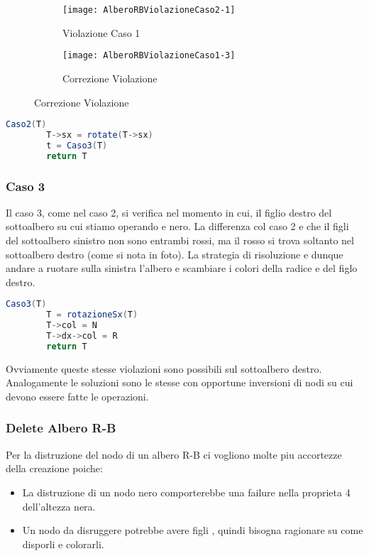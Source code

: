 \begin{figure}[H]
    \centering
    \begin{subfigure}[b]{0.35\textwidth}
        \texttt{[image: AlberoRBViolazioneCaso2-1]} 
        \caption{Violazione Caso 1}
    \end{subfigure}
    \hfill
    \begin{subfigure}[b]{0.35\textwidth}
        \texttt{[image: AlberoRBViolazioneCaso1-3]} 
        \caption{Correzione Violazione}
    \end{subfigure}
\end{figure}

\begin{lstlisting}[language=Java]
	Caso2(T)
		T->sx = rotate(T->sx)
		t = Caso3(T)
		return T
\end{lstlisting}

\subsubsection{Caso 3}

Il caso 3, come nel caso 2, si verifica nel momento in cui, il figlio destro del sottoalbero su cui stiamo operando e nero. La differenza col caso 2 e che il figli del sottoalbero sinistro non sono entrambi rossi, ma il rosso si trova soltanto nel sottoalbero destro (come si nota in foto).
La strategia di risoluzione e dunque andare a ruotare sulla sinistra l'albero e scambiare i colori della radice e del figlo destro.

\begin{lstlisting}[language=Java]
	Caso3(T)
		T = rotazioneSx(T)
		T->col = N 
		T->dx->col = R
		return T
\end{lstlisting}

Ovviamente queste stesse violazioni sono possibili sul sottoalbero destro. Analogamente le soluzioni sono le stesse con opportune inversioni di nodi su cui devono essere fatte le operazioni.

\subsubsection{Delete Albero R-B}
Per la distruzione del nodo di un albero R-B ci vogliono molte piu accortezze della creazione poiche:
\begin{itemize}
	\item La distruzione di un nodo nero comporterebbe una failure nella proprieta 4 dell'altezza nera.
	\item Un nodo da disruggere potrebbe avere figli , quindi bisogna ragionare su come disporli e colorarli.
\end{itemize}

